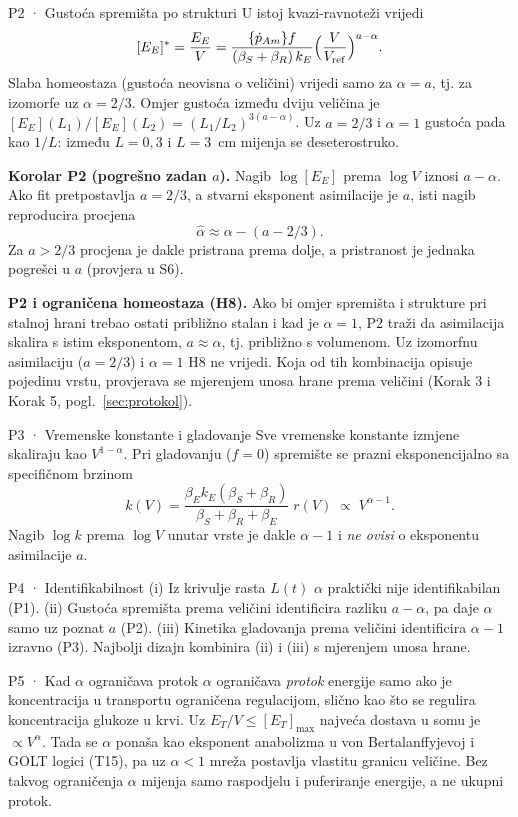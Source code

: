 \begin{propozicija}{P2 · Gustoća spremišta po strukturi}
U istoj kvazi-ravnoteži vrijedi
\[
[E_E]^{\ast}=\frac{E_E}{V}=\frac{\{\dot p_{Am}\} f}{(\beta_S+\beta_R)\,k_E}\Big(\frac{V}{V_{\mathrm{ref}}}\Big)^{a-\alpha}.
\]
Slaba homeostaza (gustoća neovisna o veličini) vrijedi samo za $\alpha=a$, tj. za izomorfe uz $\alpha=2/3$. Omjer gustoća između dviju veličina je $[E_E](L_1)/[E_E](L_2)=(L_1/L_2)^{3(a-\alpha)}$. Uz $a=2/3$ i $\alpha=1$ gustoća pada kao $1/L$: između $L=0{,}3$ i $L=3$~cm mijenja se deseterostruko.
\end{propozicija}
\textbf{Korolar P2 (pogrešno zadan $a$).} Nagib $\log[E_E]$ prema $\log V$ iznosi $a-\alpha$. Ako fit pretpostavlja $a=2/3$, a stvarni eksponent asimilacije je $a$, isti nagib reproducira procjena
\[
\hat\alpha\approx\alpha-(a-2/3).
\]
Za $a>2/3$ procjena je dakle pristrana prema dolje, a pristranost je jednaka pogrešci u $a$ (provjera u S6).

\textbf{P2 i ograničena homeostaza (H8).} Ako bi omjer spremišta i strukture pri stalnoj hrani trebao ostati približno stalan i kad je $\alpha=1$, P2 traži da asimilacija skalira s istim eksponentom, $a\approx\alpha$, tj. približno s volumenom. Uz izomorfnu asimilaciju ($a=2/3$) i $\alpha=1$ H8 ne vrijedi. Koja od tih kombinacija opisuje pojedinu vrstu, provjerava se mjerenjem unosa hrane prema veličini (Korak 3 i Korak 5, pogl.~\ref{sec:protokol}).

\begin{propozicija}{P3 · Vremenske konstante i gladovanje}
Sve vremenske konstante izmjene skaliraju kao $V^{1-\alpha}$. Pri gladovanju ($f=0$) spremište se prazni eksponencijalno sa specifičnom brzinom
\[
k(V)=\frac{\beta_E k_E(\beta_S+\beta_R)}{\beta_S+\beta_R+\beta_E}\; r(V)\;\propto\;V^{\alpha-1}.
\]
Nagib $\log k$ prema $\log V$ unutar vrste je dakle $\alpha-1$ i \emph{ne ovisi} o eksponentu asimilacije $a$.
\end{propozicija}

\begin{propozicija}{P4 · Identifikabilnost}
(i) Iz krivulje rasta $L(t)$ $\alpha$ praktički nije identifikabilan (P1). (ii) Gustoća spremišta prema veličini identificira razliku $a-\alpha$, pa daje $\alpha$ samo uz poznat $a$ (P2). (iii) Kinetika gladovanja prema veličini identificira $\alpha-1$ izravno (P3). Najbolji dizajn kombinira (ii) i (iii) s mjerenjem unosa hrane.
\end{propozicija}

\begin{propozicija}{P5 · Kad $\alpha$ ograničava protok}
$\alpha$ ograničava \emph{protok} energije samo ako je koncentracija u transportu ograničena regulacijom, slično kao što se regulira koncentracija glukoze u krvi. Uz $E_T/V\le[E_T]_{\max}$ najveća dostava u somu je $\propto V^{\alpha}$. Tada se $\alpha$ ponaša kao eksponent anabolizma u von Bertalanffyjevoj i GOLT logici (T15), pa uz $\alpha<1$ mreža postavlja vlastitu granicu veličine. Bez takvog ograničenja $\alpha$ mijenja samo raspodjelu i puferiranje energije, a ne ukupni protok.
\end{propozicija}

